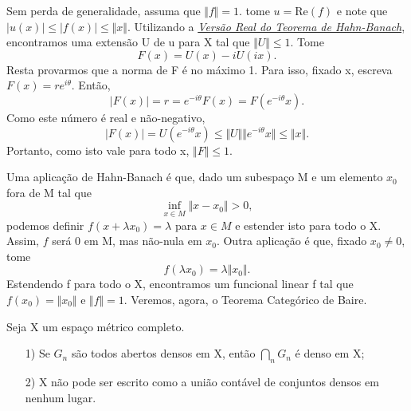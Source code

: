\documentclass[measure_theory.tex]{subfiles}
\begin{document}
\begin{proof*}
	Sem perda de generalidade, assuma que \(\Vert f \Vert = 1.\) tome \(u= \mathrm{Re}(f)\) e note que \(|u(x)|\leq |f(x)|\leq \Vert x \Vert.\) Utilizando a \hyperlink{real_hahn_banach}{\textit{Versão Real do Teorema de Hahn-Banach}}, encontramos uma extensão U de u para X tal que \(\Vert U \Vert \leq 1.\) Tome
	\[
		F(x) = U(x) - iU(ix).
	\]
	Resta provarmos que a norma de F é no máximo 1. Para isso, fixado x, escreva \(F(x) = re^{i\theta }.\) Então,
	\[
		|F(x)| = r = e^{-i\theta }F(x) = F(e^{-i\theta }x).
	\]
	Como este número é real e não-negativo,
	\[
		|F(x)| = U(e^{-i\theta }x)\leq \Vert U \Vert\Vert e^{-i\theta }x \Vert\leq \Vert x \Vert.
	\]
	Portanto, como isto vale para todo x, \(\Vert F \Vert \leq 1\). \qedsymbol
\end{proof*}
Uma aplicação de Hahn-Banach é que, dado um subespaço M e um elemento \(x_{0}\) fora de M tal que
\[
	\inf_{x\in M}\Vert x-x_{0} \Vert > 0,
\]
podemos definir \(f(x+\lambda x_{0}) = \lambda \) para \(x\in M\) e estender isto para todo o X. Assim, \(f\) será 0 em M, mas não-nula em \(x_{0}\). Outra aplicação é que, fixado \(x_{0}\neq 0\), tome
\[
	f(\lambda x_{0}) = \lambda \Vert x_{0} \Vert.
\]
Estendendo f para todo o X, encontramos um funcional linear f tal que \(f(x_{0}) = \Vert x_{0} \Vert \) e \(\Vert f \Vert = 1\).
Veremos, agora, o Teorema Categórico de Baire.
\hypertarget{baire_category}{
	\begin{theorem*}
		Seja X um espaço métrico completo.
		\begin{itemize}
			\item[1)] Se \(G_{n}\) são todos abertos densos em X, então \(\bigcap_{n}^{}G_{n}\) é denso em X;
			\item[2)] X não pode ser escrito como a união contável de conjuntos densos em nenhum lugar.
		\end{itemize}
	\end{theorem*}
}
\end{document}

